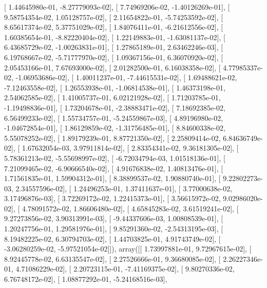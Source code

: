 \documentclass{article}
\begin{document}
       [  1.44645980e-01,  -8.27779093e-02],
       [  7.74969206e-02,  -1.40126269e-01],
       [  9.58754354e-02,   1.05128757e-02],
       [  2.11654822e-01,  -5.74253592e-02],
       [  8.65617374e-02,   5.37751029e-02],
       [  1.84076411e-01,  -6.21612556e-02],
       [  1.60385654e-01,  -8.82220404e-02],
       [  1.22149883e-01,  -1.63081137e-02],
       [  6.43685729e-02,  -1.00263831e-01],
       [  1.27865189e-01,   2.63462246e-03],
       [  6.19768667e-02,  -5.71777970e-02],
       [  1.09367156e-01,   6.36070920e-02],
       [  2.05453166e-01,   7.67693000e-02],
       [  2.01282500e-01,   6.16038358e-02],
       [  4.77985337e-02,  -1.06953686e-02],
       [  1.40011237e-01,  -7.44615531e-02],
       [  1.69488621e-02,  -7.12463558e-02],
       [  1.26553938e-01,  -1.06814538e-01],
       [  1.46373198e-01,   2.54062585e-02],
       [  1.41005737e-01,   6.02121928e-02],
       [  1.71203785e-01,  -1.19498836e-01],
       [  1.73204678e-01,  -2.38883471e-02],
       [  7.18692385e-02,   6.56499233e-02],
       [  1.55734757e-01,  -5.24559867e-03],
       [  4.89196980e-02,  -1.04672854e-01],
       [  1.86129859e-02,  -1.31756485e-01],
       [  8.84600338e-02,   5.55078252e-02],
       [  1.89179239e-01,   8.87721350e-02],
       [  2.25809414e-02,   6.84636749e-02],
       [  1.67632054e-03,   3.97911814e-02],
       [  2.83354341e-02,   9.36181305e-02],
       [  5.78361213e-02,  -5.55698997e-02],
       [ -6.72034794e-03,   1.01518136e-01],
       [  7.21099465e-02,  -6.90666540e-02],
       [  4.91676838e-02,   1.40813476e-01],
       [  1.71561835e-01,   1.59904312e-01],
       [  8.38899537e-02,   1.90880740e-01],
       [  9.22802273e-03,   2.34557596e-02],
       [  1.24496253e-01,   1.37411637e-01],
       [  3.77000638e-02,   3.17496876e-03],
       [  3.72269172e-02,   1.22415373e-01],
       [  3.56615972e-02,   9.02986020e-02],
       [  4.78091572e-02,   1.86606480e-02],
       [  4.65845283e-02,   3.61519241e-02],
       [  9.27273856e-02,   3.90313991e-03],
       [ -9.44337606e-03,   1.00808539e-01],
       [  1.20247756e-01,   1.29581976e-01],
       [  9.85291360e-02,  -2.54313195e-03],
       [  8.19482225e-02,   6.30794703e-02],
       [  1.44703825e-01,   4.91743749e-02],
       [ -3.06280259e-02,  -5.97521054e-02]]), array([[  1.73997881e-01,   9.72967615e-02],
       [  8.92445778e-02,   6.63135547e-02],
       [  2.27526666e-01,   9.36680085e-02],
       [  2.26227346e-01,   4.71086229e-02],
       [  2.20723115e-01,  -7.41169375e-02],
       [  9.80270336e-02,   6.76748172e-02],
       [  1.08877292e-01,  -5.24168516e-03],
\end{document}
